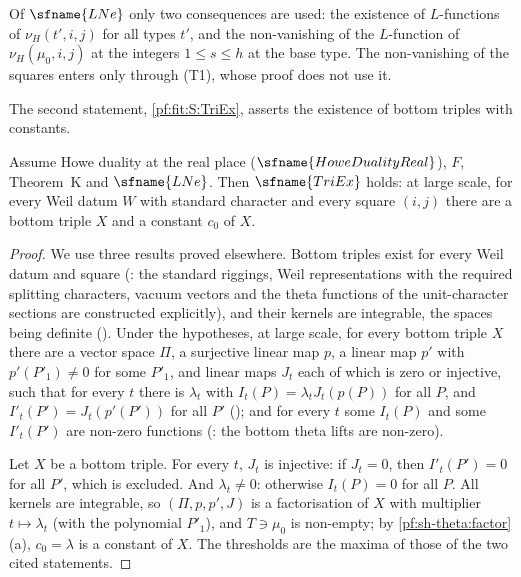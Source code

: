 \begin{remark}\label{pf:sh-theta:towerrem}
Of $\sfname{LNe}$ only two consequences are used: the existence of $L$-functions of $\nu_H(t',i,j)$ for all types $t'$,
and the non-vanishing of the $L$-function of $\nu_H(\mu_0,i,j)$ at the integers $1\le s\le h$ at the base type. The
non-vanishing of the squares enters only through (T1), whose proof does not use it.
\end{remark}

The second statement, \ref{pf:fit:S:TriEx}, asserts the existence of bottom triples with constants.

\begin{theorem}\label{pf:sh-theta:triex}
Assume Howe duality at the real place ($\sfname{HoweDualityReal}$), $F$, Theorem~K and $\sfname{LNe}$. Then $\sfname{TriEx}$
holds: at large scale, for every Weil datum $W$ with standard character and every square $(i,j)$ there are a bottom triple
$X$ and a constant $c_0$ of $X$.
\end{theorem}

\begin{proof}
We use three results proved elsewhere. Bottom triples exist for every Weil datum and square
(: the standard riggings, Weil representations with the required
splitting characters, vacuum vectors and the theta functions of the unit-character sections are constructed explicitly), and
their kernels are integrable, the spaces being definite (). Under the
hypotheses, at large scale, for every bottom triple $X$ there are a vector space $\Pi$, a surjective linear map $p$, a linear
map $p'$ with $p'(P'_1)\ne0$ for some $P'_1$, and linear maps $J_t$ each of which is zero or injective, such that for every $t$
there is $\lambda_t$ with $I_t(P)=\lambda_tJ_t(p(P))$ for all $P$, and $I'_t(P')=J_t(p'(P'))$ for all $P'$
(); and for every $t$ some $I_t(P)$ and some $I'_t(P')$ are
non-zero functions (: the bottom theta lifts are non-zero).

Let $X$ be a bottom triple. For every $t$, $J_t$ is injective: if $J_t=0$, then $I'_t(P')=0$ for all $P'$, which is
excluded. And $\lambda_t\ne0$: otherwise $I_t(P)=0$ for all $P$. All kernels are integrable, so $(\Pi,p,p',J)$ is a
factorisation of $X$ with multiplier $t\mapsto\lambda_t$ (with the polynomial $P'_1$), and $T\ni\mu_0$ is non-empty; by
\cref{pf:sh-theta:factor}(a), $c_0=\lambda$ is a constant of $X$. The thresholds are the maxima of those of the two cited
statements.
\end{proof}

